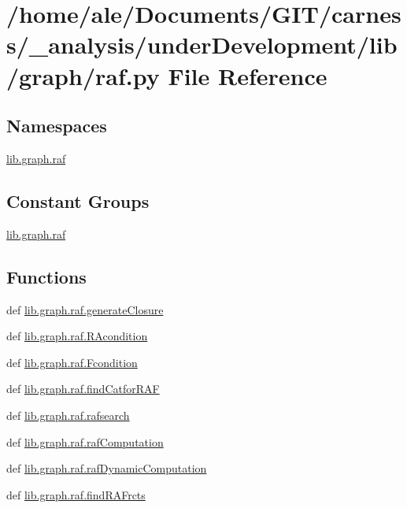 \hypertarget{a00049}{\section{/home/ale/\-Documents/\-G\-I\-T/carness/\-\_\-analysis/under\-Development/lib/graph/raf.py File Reference}
\label{a00049}
}
\subsection*{Namespaces}
\begin{DoxyCompactItemize}
\item 
\hyperlink{a00107}{lib.\-graph.\-raf}
\end{DoxyCompactItemize}
\subsection*{Constant Groups}
\begin{DoxyCompactItemize}
\item 
\hyperlink{a00107}{lib.\-graph.\-raf}
\end{DoxyCompactItemize}
\subsection*{Functions}
\begin{DoxyCompactItemize}
\item 
def \hyperlink{a00107_a56510e9067d8a6c8f90847d6656ce709}{lib.\-graph.\-raf.\-generate\-Closure}
\item 
def \hyperlink{a00107_a9896a4198e08978afb80e86697f1bbd0}{lib.\-graph.\-raf.\-R\-Acondition}
\item 
def \hyperlink{a00107_a160a90fb55ff323fc86fcdc65b30b90f}{lib.\-graph.\-raf.\-Fcondition}
\item 
def \hyperlink{a00107_aaeb3a479f24daf493cc7052aef879d2c}{lib.\-graph.\-raf.\-find\-Catfor\-R\-A\-F}
\item 
def \hyperlink{a00107_a532a434a0b2fe187a3ff5a8319e4e3b4}{lib.\-graph.\-raf.\-rafsearch}
\item 
def \hyperlink{a00107_a3c9606e9d3274506955225eacf05877e}{lib.\-graph.\-raf.\-raf\-Computation}
\item 
def \hyperlink{a00107_a0b49d65e78e62c4ddd5022d4405f8286}{lib.\-graph.\-raf.\-raf\-Dynamic\-Computation}
\item 
def \hyperlink{a00107_aa4fb376eecb97a88efdb35aa15466c3b}{lib.\-graph.\-raf.\-find\-R\-A\-Frcts}
\end{DoxyCompactItemize}
